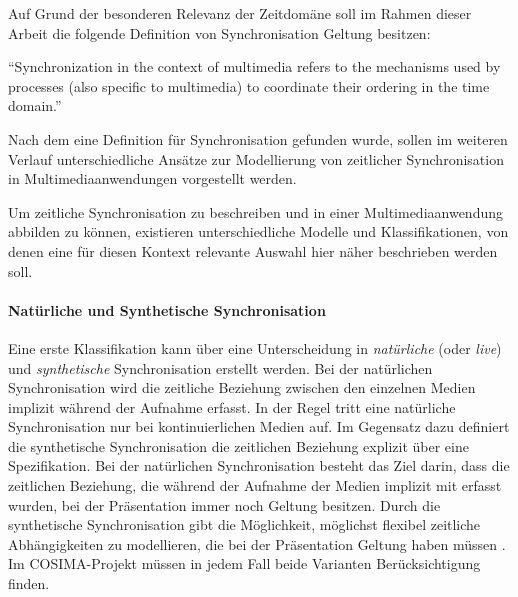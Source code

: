    Auf Grund der besonderen Relevanz der Zeitdomäne soll im Rahmen dieser Arbeit die folgende Definition von Synchronisation Geltung besitzen: 
  
  \begin{definition}[Synchronisation]\label{def:synchronisation}
    "`Synchronization in the context of multimedia refers to the mechanisms used by processes (also specific to multimedia) to coordinate their ordering in the time domain."' \emph{\citep[S. 401]{steinmetz1990spm}}
  \end{definition}
  
  Nach dem eine Definition für Synchronisation gefunden wurde, sollen im weiteren Verlauf unterschiedliche Ansätze zur Modellierung von zeitlicher Synchronisation in Multimediaanwendungen vorgestellt werden.
  
\label{msec:modelle_zur_beschreibung_zeitlicher_synchronisation}

  Um zeitliche Synchronisation zu beschreiben und in einer Multimediaanwendung abbilden zu können, existieren unterschiedliche Modelle und Klassifikationen, von denen eine für diesen Kontext relevante Auswahl hier näher beschrieben werden soll.
  
\paragraph{Natürliche und Synthetische Synchronisation} %
\label{par:natuerliche_und_synthetische_synchronisation}

  Eine erste Klassifikation kann über eine Unterscheidung in \emph{natürliche} (oder \emph{live}) und \emph{synthetische} Synchronisation \citep{little1991ms,little1991msp,steinmetz1992mst} erstellt werden. Bei der natürlichen Synchronisation wird die zeitliche Beziehung zwischen den einzelnen Medien implizit wäh\-rend der Aufnahme erfasst. In der Regel tritt eine natürliche Synchronisation nur bei kontinuierlichen Medien auf. Im Gegensatz dazu definiert die synthetische Synchronisation die zeitlichen Beziehung explizit über eine Spezifikation. Bei der natürlichen Synchronisation besteht das Ziel darin, dass die zeitlichen Beziehung, die während der Aufnahme der Medien implizit mit erfasst wurden, bei der Präsentation immer noch Geltung besitzen. Durch die synthetische Synchronisation gibt die Möglichkeit, möglichst flexibel zeitliche Abhängigkeiten zu modellieren, die bei der Präsentation Geltung haben müssen \citep[S. 613]{bertino1998tsm}. Im COSIMA-Projekt müssen in jedem Fall beide Varianten Berücksichtigung finden.
  
